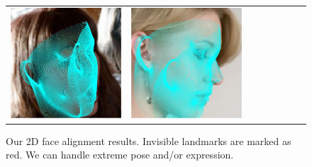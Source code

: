 \begin{figure}[t!]
\begin{center}
\begin{tabular}{ @{\hskip 1.5mm}c@{\hskip 1.5mm}c@{\hskip 1.5mm}c@{\hskip 1.5mm}c@{}c@{}c@{}c@{\hskip 1.5mm}c@{}}
\includegraphics[width=\AlignFigWid]{img/results/AFLW2000/_pred_AFLW2000_overlay_1159.jpg} &
\includegraphics[width=\AlignFigWid]{img/results/AFLW2000/_pred_AFLW2000_overlay_450.jpg} &
\\
\end{tabular}
\vspace{-2mm}
\caption{\small Our 2D face alignment results. Invisible landmarks are marked as red. We can handle extreme pose and/or expression. }
\label{fig:2d_align}\figvspace \vspace{-2mm}
\end{center}
\end{figure}





